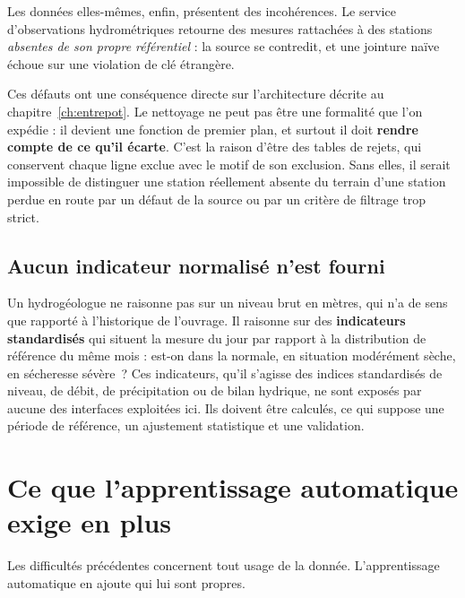Les données elles-mêmes, enfin, présentent des incohérences. Le service d'observations
hydrométriques retourne des mesures rattachées à des stations \emph{absentes de son propre
référentiel} : la source se contredit, et une jointure naïve échoue sur une violation de clé
étrangère.

Ces défauts ont une conséquence directe sur l'architecture décrite au
chapitre~\ref{ch:entrepot}. Le nettoyage ne peut pas être une formalité que l'on expédie : il
devient une fonction de premier plan, et surtout il doit \textbf{rendre compte de ce qu'il
écarte}. C'est la raison d'être des tables de rejets, qui conservent chaque ligne exclue avec le
motif de son exclusion. Sans elles, il serait impossible de distinguer une station réellement
absente du terrain d'une station perdue en route par un défaut de la source ou par un critère de
filtrage trop strict.

\subsection{Aucun indicateur normalisé n'est fourni}

Un hydrogéologue ne raisonne pas sur un niveau brut en mètres, qui n'a de sens que rapporté à
l'historique de l'ouvrage. Il raisonne sur des \textbf{indicateurs standardisés} qui situent la
mesure du jour par rapport à la distribution de référence du même mois : est-on dans la normale,
en situation modérément sèche, en sécheresse sévère~? Ces indicateurs, qu'il s'agisse des indices standardisés de
niveau, de débit, de précipitation ou de bilan hydrique, ne sont exposés par aucune des
interfaces exploitées ici. Ils doivent être calculés, ce qui suppose une période de référence, un ajustement
statistique et une validation.

\section{Ce que l'apprentissage automatique exige en plus}

Les difficultés précédentes concernent tout usage de la donnée. L'apprentissage automatique en
ajoute qui lui sont propres.

